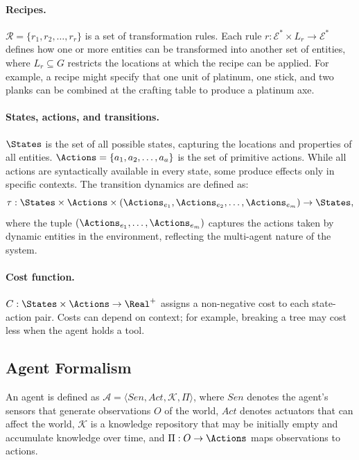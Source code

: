 \paragraph{Recipes.} $\mathcal{R} = \{r_1, r_2, \ldots, r_r\}$ is a set of transformation rules. Each rule $r : \mathcal{E}^* \times L_r \rightarrow \mathcal{E}^*$ defines how one or more entities can be transformed into another set of entities, where $L_r \subseteq G$ restricts the locations at which the recipe can be applied. For example, a recipe might specify that one unit of platinum, one stick, and two planks can be combined at the crafting table to produce a platinum axe.

\paragraph{States, actions, and transitions.} $\States$ is the set of all possible states, capturing the locations and properties of all entities. $\Actions = \{a_1, a_2, \ldots, a_a\}$ is the set of primitive actions. While all actions are syntactically available in every state, some produce effects only in specific contexts. The transition dynamics are defined as:
\[
\tau : \States \times \Actions \times (\Actions_{e_1}, \Actions_{e_2}, \ldots, \Actions_{e_m}) \rightarrow \States,
\]
where the tuple $(\Actions_{e_1}, \ldots, \Actions_{e_m})$ captures the actions taken by dynamic entities in the environment, reflecting the multi-agent nature of the system.

\paragraph{Cost function.} $C : \States \times \Actions \rightarrow \Real^+$ assigns a non-negative cost to each state-action pair. Costs can depend on context; for example, breaking a tree may cost less when the agent holds a tool.

\subsection{Agent Formalism}
\label{sec:ng_agent}

An agent is defined as $\mathcal{A} = \langle Sen, Act, \mathcal{K}, \Pi \rangle$, where $Sen$ denotes the agent's sensors that generate observations $O$ of the world, $Act$ denotes actuators that can affect the world, $\mathcal{K}$ is a knowledge repository that may be initially empty and accumulate knowledge over time, and $\Pi : O \rightarrow \Actions$ maps observations to actions.

